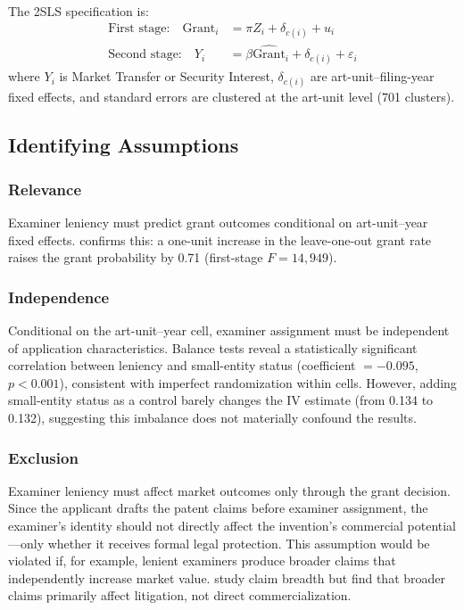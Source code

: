 \documentclass[12pt]{article}
\begin{document}
The 2SLS specification is:
\begin{align}
\text{First stage:} \quad \text{Grant}_i &= \pi Z_i + \delta_{c(i)} + u_i \\
\text{Second stage:} \quad Y_i &= \beta \widehat{\text{Grant}}_i + \delta_{c(i)} + \varepsilon_i
\end{align}
where $Y_i$ is Market Transfer or Security Interest, $\delta_{c(i)}$ are art-unit--filing-year fixed effects, and standard errors are clustered at the art-unit level (701 clusters).

\subsection{Identifying Assumptions}

\subsubsection*{Relevance} Examiner leniency must predict grant outcomes conditional on art-unit--year fixed effects.  confirms this: a one-unit increase in the leave-one-out grant rate raises the grant probability by 0.71 (first-stage $F = 14{,}949$).

\subsubsection*{Independence} Conditional on the art-unit--year cell, examiner assignment must be independent of application characteristics. Balance tests reveal a statistically significant correlation between leniency and small-entity status (coefficient $= -0.095$, $p < 0.001$), consistent with imperfect randomization within cells. However, adding small-entity status as a control barely changes the IV estimate (from 0.134 to 0.132), suggesting this imbalance does not materially confound the results.

\subsubsection*{Exclusion} Examiner leniency must affect market outcomes only through the grant decision. Since the applicant drafts the patent claims before examiner assignment, the examiner's identity should not directly affect the invention's commercial potential---only whether it receives formal legal protection. This assumption would be violated if, for example, lenient examiners produce broader claims that independently increase market value. \citet{feng2020crafting} study claim breadth but find that broader claims primarily affect litigation, not direct commercialization.
\end{document}
